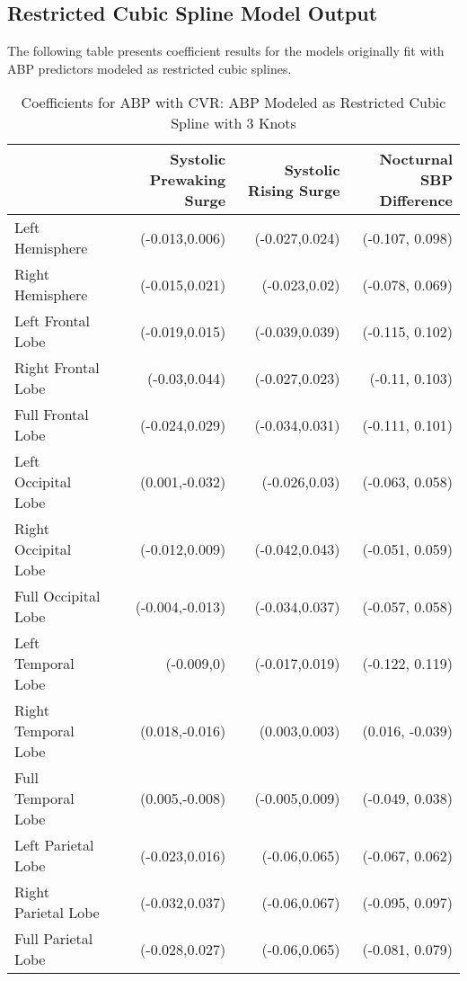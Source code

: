 \documentclass[10pt]{article}\usepackage[]{graphicx}\usepackage[]{color}
\begin{document}
\clearpage
\subsection{Restricted Cubic Spline Model Output}

The following table presents coefficient results for the models originally fit with ABP predictors modeled as restricted cubic splines.  




\begin{table}[ht]
\centering
\caption{Coefficients for ABP with CVR: ABP Modeled as Restricted Cubic Spline with 3 Knots} 
\begin{tabular}{lrrr}
  \toprule
 & Systolic Prewaking Surge & Systolic Rising Surge & Nocturnal SBP Difference \\ 
  \midrule
Left Hemisphere & (-0.013,0.006) & (-0.027,0.024) & (-0.107,  0.098) \\ 
  Right Hemisphere & (-0.015,0.021) & (-0.023,0.02) & (-0.078,  0.069) \\ 
  Left Frontal Lobe & (-0.019,0.015) & (-0.039,0.039) & (-0.115,  0.102) \\ 
  Right Frontal Lobe & (-0.03,0.044) & (-0.027,0.023) & (-0.11,  0.103) \\ 
  Full Frontal Lobe & (-0.024,0.029) & (-0.034,0.031) & (-0.111,  0.101) \\ 
  Left Occipital Lobe & (0.001,-0.032) & (-0.026,0.03) & (-0.063,  0.058) \\ 
  Right Occipital Lobe & (-0.012,0.009) & (-0.042,0.043) & (-0.051,  0.059) \\ 
  Full Occipital Lobe & (-0.004,-0.013) & (-0.034,0.037) & (-0.057,  0.058) \\ 
  Left Temporal Lobe & (-0.009,0) & (-0.017,0.019) & (-0.122,  0.119) \\ 
  Right Temporal Lobe & (0.018,-0.016) & (0.003,0.003) & (0.016,  -0.039) \\ 
  Full Temporal Lobe & (0.005,-0.008) & (-0.005,0.009) & (-0.049,  0.038) \\ 
  Left Parietal Lobe & (-0.023,0.016) & (-0.06,0.065) & (-0.067,  0.062) \\ 
  Right Parietal Lobe & (-0.032,0.037) & (-0.06,0.067) & (-0.095,  0.097) \\ 
  Full Parietal Lobe & (-0.028,0.027) & (-0.06,0.065) & (-0.081,  0.079) \\ 
   \bottomrule
\end{tabular}
\end{table}
\end{document}
